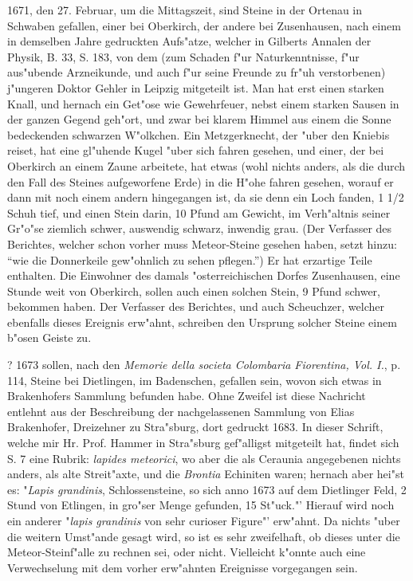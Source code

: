 \documentclass[a4paper, 11pt, oneside, polutonikogreek, german]{article}
\begin{document}
1671, den 27. Februar, um die Mittagszeit, sind Steine in der Ortenau in Schwaben gefallen, einer bei Oberkirch, der andere bei Zusenhausen, nach einem in demselben Jahre gedruckten Aufs"atze, welcher in Gilberts Annalen der Physik, B. 33, S. 183, von dem (zum Schaden f"ur Naturkenntnisse, f"ur aus"ubende Arzneikunde, und auch f"ur seine Freunde zu fr"uh verstorbenen) j"ungeren Doktor Gehler in Leipzig mitgeteilt ist. Man hat erst einen starken Knall, und hernach ein Get"ose wie Gewehrfeuer, nebst einem starken Sausen in der ganzen Gegend geh"ort, und zwar bei klarem Himmel aus einem die Sonne bedeckenden schwarzen W"olkchen. Ein Metzgerknecht, der "uber den Kniebis reiset, hat eine gl"uhende Kugel "uber sich fahren gesehen, und einer, der bei Oberkirch an einem Zaune arbeitete, hat etwas (wohl nichts anders, als die durch den Fall des Steines aufgeworfene Erde) in die H"ohe fahren gesehen, worauf er dann mit noch einem andern hingegangen ist, da sie denn ein Loch fanden, 1 1/2 Schuh tief, und einen Stein darin, 10 Pfund am Gewicht, im Verh"altnis seiner Gr"o"se ziemlich schwer, auswendig schwarz, inwendig grau. (Der Verfasser des Berichtes, welcher schon vorher muss Meteor-Steine gesehen haben, setzt hinzu: "`wie die Donnerkeile gew"ohnlich zu sehen pflegen."') Er hat erzartige Teile enthalten. Die Einwohner des damals "osterreichischen Dorfes Zusenhausen, eine Stunde weit von Oberkirch, sollen auch einen solchen Stein, 9 Pfund schwer, bekommen haben. Der Verfasser des Berichtes, und auch Scheuchzer, welcher ebenfalls dieses Ereignis erw"ahnt, schreiben den Ursprung solcher Steine einem b"osen Geiste zu.

? 1673 sollen, nach den \emph{Memorie della societa Colombaria Fiorentina, Vol. I.}, p. 114, Steine bei Dietlingen, im Badenschen, gefallen sein, wovon sich etwas in Brakenhofers Sammlung befunden habe. Ohne Zweifel ist diese Nachricht entlehnt aus der Beschreibung der nachgelassenen Sammlung von Elias Brakenhofer, Dreizehner zu Stra"sburg, dort gedruckt 1683. In dieser Schrift, welche mir Hr. Prof. Hammer in Stra"sburg gef"alligst mitgeteilt hat, findet sich S. 7 eine Rubrik: \emph{lapides meteorici}, wo aber die als Ceraunia angegebenen nichts anders, als alte Streit"axte, und die \emph{Brontia} Echiniten waren; hernach aber hei"st es: "\emph{Lapis grandinis}, Schlossensteine, so sich anno 1673 auf dem Dietlinger Feld, 2 Stund von Etlingen, in gro"ser Menge gefunden, 15 St"uck."' Hierauf wird noch ein anderer "\emph{lapis grandinis} von sehr curioser Figure"' erw"ahnt. Da nichts "uber die weitern Umst"ande gesagt wird, so ist es sehr zweifelhaft, ob dieses unter die Meteor-Steinf"alle zu rechnen sei, oder nicht. Vielleicht k"onnte auch eine Verwechselung mit dem vorher erw"ahnten Ereignisse vorgegangen sein.
\end{document}

